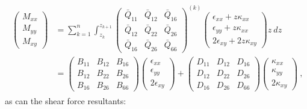\begin{gather} 
	\begin{aligned}
		\begin{pmatrix}
			M_{xx} \\
			M_{yy} \\
			M_{xy} 
		\end{pmatrix} 
		& = 
		\sum_{k=1}^n
		\int_{z_k}^{z_{k+1}}
		{\begin{pmatrix}
				\bar{Q}_{11} & \bar{Q}_{12} &  \bar{Q}_{16} \\
				\bar{Q}_{12} & \bar{Q}_{22} &  \bar{Q}_{26} \\
				\bar{Q}_{16} & \bar{Q}_{26} & \bar{Q}_{66} 
		\end{pmatrix}}^{(k)}
		\begin{pmatrix}
			\epsilon_{xx} + z \kappa_{xx}\\
			\epsilon_{yy} + z \kappa_{xx}\\
			2\epsilon_{xy} + 2z\kappa_{xy}
		\end{pmatrix}
		z\ dz \\
		& =
		\begin{pmatrix}
			{B}_{11} & {B}_{12} &  {B}_{16} \\
			{B}_{12} & {B}_{22} &  {B}_{26} \\
			{B}_{16} & {B}_{26} & {B}_{66} 
		\end{pmatrix}
		\begin{pmatrix}
			\epsilon_{xx}\\
			\epsilon_{yy}\\
			2\epsilon_{xy}
		\end{pmatrix}
		+
		\begin{pmatrix}
			{D}_{11} & {D}_{12} &  {D}_{16} \\
			{D}_{12} & {D}_{22} &  {D}_{26} \\
			{D}_{16} & {D}_{26} & {D}_{66} 
		\end{pmatrix}
		\begin{pmatrix}
			\kappa_{xx}\\
			\kappa_{yy}\\
			2\kappa_{xy}
		\end{pmatrix}\ ,
		\label{eqscomp_laminate_constitutive4}
	\end{aligned}
\end{gather}
as can the shear force resultants:
